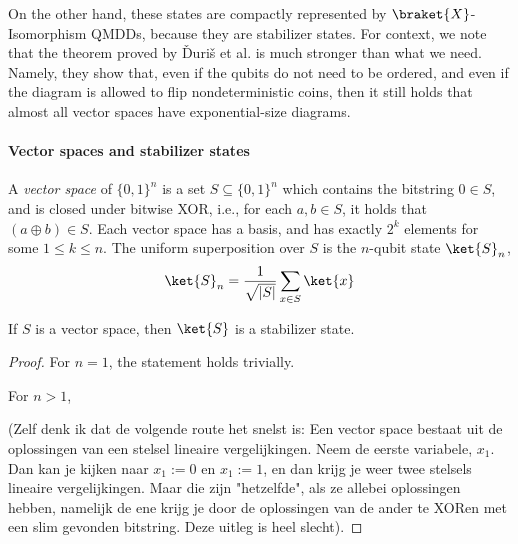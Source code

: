 On the other hand, these states are compactly represented by $\braket{X}$-Isomorphism QMDDs, because they are stabilizer states.
For context, we note that the theorem proved by \v{D}uri\v{s} et al. is much stronger than what we need.
Namely, they show that, even if the qubits do not need to be ordered, and even if the diagram is allowed to flip nondeterministic coins, then it still holds that almost all vector spaces have exponential-size diagrams.

\paragraph{Vector spaces and stabilizer states}
A \emph{vector space} of $\{0,1\}^n$ is a set $S\subseteq\{0,1\}^n$ which contains the bitstring $0\in S$, and is closed under bitwise XOR, i.e., for each $a,b\in S$, it holds that $(a\oplus b)\in S$.
Each vector space has a basis, and has exactly $2^k$ elements for some $1\leq k\leq n$.
The uniform superposition over $S$ is the $n$-qubit state $\ket{S}_n$,
\begin{align}
	\ket{S}_n =\frac{1}{\sqrt{|S|}} \sum_{x\in S}\ket{x}
\end{align}
\begin{theorem}
If $S$ is a vector space, then $\ket{S}$ is a stabilizer state.
\end{theorem}
\begin{proof}
	For $n=1$, the statement holds trivially.
	
	For $n>1$, 
	
	(Zelf denk ik dat de volgende route het snelst is: Een vector space bestaat uit de oplossingen van een stelsel lineaire vergelijkingen. Neem de eerste variabele, $x_1$. Dan kan je kijken naar $x_1:=0$ en $x_1:=1$, en dan krijg je weer twee stelsels lineaire vergelijkingen. Maar die zijn "hetzelfde", als ze allebei oplossingen hebben, namelijk de ene krijg je door de oplossingen van de ander te XORen met een slim gevonden bitstring. Deze uitleg is heel slecht).
\end{proof}
